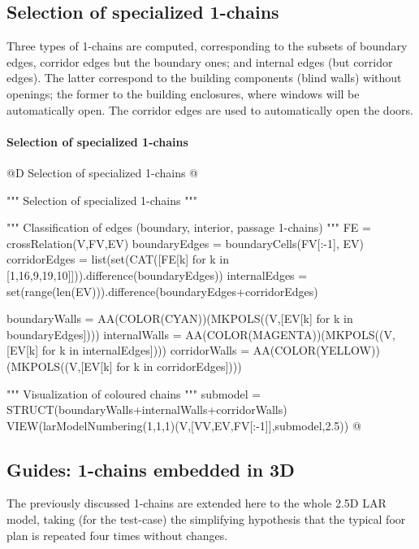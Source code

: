 \documentclass[11pt,oneside]{article}    %
\begin{document}
\subsection{Selection of specialized 1-chains}

Three types of 1-chains are computed, corresponding to the subsets of boundary edges, corridor edges but the boundary ones; and  internal edges (but corridor edges). The latter correspond to the building components (blind walls) without openings; the former to the building enclosures, where windows will be automatically open. The corridor edges are used to automatically open the doors.

\paragraph{Selection of specialized 1-chains}
@D Selection of specialized 1-chains
@{""" Selection of specialized 1-chains """

""" Classification of edges (boundary, interior, passage 1-chains) """
FE = crossRelation(V,FV,EV)
boundaryEdges = boundaryCells(FV[:-1], EV)
corridorEdges = list(set(CAT([FE[k] for k in [1,16,9,19,10]])).difference(boundaryEdges))
internalEdges = set(range(len(EV))).difference(boundaryEdges+corridorEdges)

boundaryWalls = AA(COLOR(CYAN))(MKPOLS((V,[EV[k] for k in boundaryEdges])))
internalWalls = AA(COLOR(MAGENTA))(MKPOLS((V,[EV[k] for k in internalEdges])))
corridorWalls = AA(COLOR(YELLOW))(MKPOLS((V,[EV[k] for k in corridorEdges])))

""" Visualization of coloured chains """
submodel = STRUCT(boundaryWalls+internalWalls+corridorWalls)
VIEW(larModelNumbering(1,1,1)(V,[VV,EV,FV[:-1]],submodel,2.5))
@}

\subsection{Guides: 1-chains embedded in 3D}

The previously discussed 1-chains are extended here to the whole 2.5D LAR model, taking (for the test-case) the simplifying hypothesis that the typical foor plan is repeated four times without changes.
\end{document}
